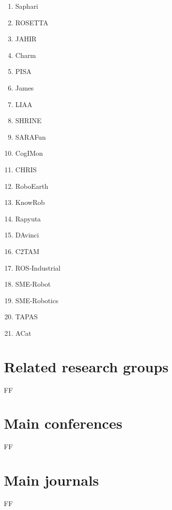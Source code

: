 \begin{multicols}{4}
	\begin{enumerate}
		\item Saphari
		\item ROSETTA
		\item JAHIR
		\item Charm
		\item PISA
		\item James
		\item LIAA
		\item SHRINE
		\item SARAFun
		\item CogIMon
		\item CHRIS
		\item RoboEarth
		\item KnowRob
		\item Rapyuta
		\item DAvinci
		\item C2TAM
		\item ROS-Industrial
		\item SME-Robot
		\item SME-Robotics
		\item TAPAS
		\item ACat
	\end{enumerate}
\end{multicols}

\section{Related research groups}

FF


\section{Main conferences}

FF


\section{Main journals}

FF

